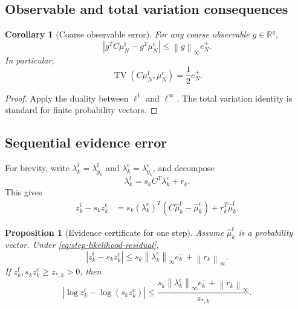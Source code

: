 \documentclass[11pt]{article}
\newtheorem{proposition}[theorem]{Proposition}
\newtheorem{corollary}[theorem]{Corollary}
\theoremstyle{definition}
\theoremstyle{remark}
\newcommand{\R}{\mathbb R}
\newcommand{\TV}{\operatorname{TV}}
\newcommand{\norm}[1]{\left\lVert #1\right\rVert}
\newcommand{\abs}[1]{\left\lvert #1\right\rvert}
\newcommand{\fine}{\mathrm f}
\newcommand{\coarse}{\mathrm c}
\begin{document}
\subsection{Observable and total variation consequences}

\begin{corollary}[Coarse observable error]\label{cor:observable-error}
For any coarse observable $g\in\R^q$,
\[
  \abs{g^TC\mu_N^{\fine}-g^T\mu_N^{\coarse}}
  \leq
  \norm{g}_{\infty}e_N^+.
\]
In particular,
\[
  \TV(C\mu_N^{\fine},\mu_N^{\coarse})
  =\frac12e_N^+.
\]
\end{corollary}

\begin{proof}
Apply the duality between $\ell^1$ and $\ell^\infty$.  The total variation identity is standard for finite probability vectors.
\end{proof}

\subsection{Sequential evidence error}
For brevity, write $\lambda_k^{\fine}=\lambda_{y_k}^{\fine}$ and $\lambda_k^{\coarse}=\lambda_{y_k}^{\coarse}$, and decompose
\begin{equation}\label{eq:step-likelihood-residual}
  \lambda_k^{\fine}
  =s_kC^T\lambda_k^{\coarse}+r_k.
\end{equation}
This gives
\begin{align}
  z_k^{\fine}-s_kz_k^{\coarse}
  &=
  s_k(\lambda_k^{\coarse})^T
  (C\widehat\mu_k^{\fine}-\widehat\mu_k^{\coarse})
  +r_k^T\widehat\mu_k^{\fine}.
  \label{eq:evidence-error-identity}
\end{align}

\begin{proposition}[Evidence certificate for one step]\label{prop:evidence-error}
Assume $\widehat\mu_k^{\fine}$ is a probability vector.  Under \eqref{eq:step-likelihood-residual},
\begin{equation}\label{eq:evidence-error-bound}
  \boxed{
  \abs{z_k^{\fine}-s_kz_k^{\coarse}}
  \leq
  s_k\norm{\lambda_k^{\coarse}}_{\infty}e_k^-
  +\norm{r_k}_{\infty}.}
\end{equation}
If $z_k^{\fine},s_kz_k^{\coarse}\geq z_{*,k}>0$, then
\begin{equation}\label{eq:log-evidence-step}
  \boxed{
  \abs{
  \log z_k^{\fine}
  -\log(s_kz_k^{\coarse})}
  \leq
  \frac{
  s_k\norm{\lambda_k^{\coarse}}_{\infty}e_k^-
  +\norm{r_k}_{\infty}
  }{z_{*,k}}.}
\end{equation}
\end{proposition}
\end{document}
